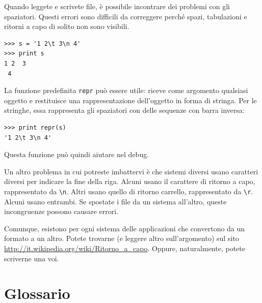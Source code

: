 \documentclass[10pt]{book}
\begin{document}
Quando leggete e scrivete file, è possibile incontrare dei problemi con gli spaziatori. Questi errori sono difficili da correggere perché spazi, tabulazioni e ritorni a capo di solito non sono visibili.

\begin{verbatim}
>>> s = '1 2\t 3\n 4'
>>> print s
1 2	 3
 4
\end{verbatim}

La funzione predefinita {\tt repr} può essere utile: riceve come argomento qualsiasi oggetto e restituisce una rappresentazione dell'oggetto in forma di stringa. Per le stringhe, essa rappresenta gli spaziatori con delle sequenze con barra inversa:

\begin{verbatim}
>>> print repr(s)
'1 2\t 3\n 4'
\end{verbatim}

Questa funzione può quindi aiutare nel debug.

Un altro problema in cui potreste imbattervi è che sistemi diversi usano caratteri diversi per indicare la fine della riga. Alcuni usano il carattere di ritorno a capo, rappresentato da \verb"\n".  Altri usano quello di ritorno carrello, rappresentato da \verb"\r".  Alcuni usano entrambi. Se spostate i file da un sistema all'altro, queste incongruenze possono causare errori.

Comunque, esistono per ogni sistema delle applicazioni che convertono da un formato a un altro. Potete trovarne (e leggere altro sull'argomento) sul sito \url{http://it.wikipedia.org/wiki/Ritorno_a_capo}.  Oppure, naturalmente, potete scriverne una voi.


\section{Glossario}
\end{document}
